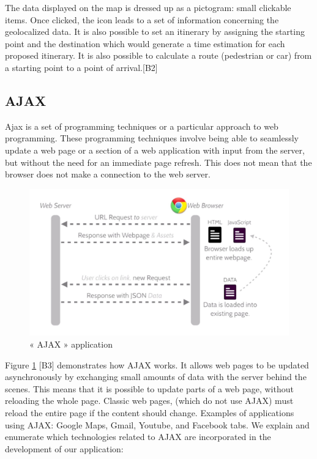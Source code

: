 The data displayed on the map is dressed up as a pictogram: small clickable items. Once clicked, the icon leads to a set of information concerning the geolocalized data. 
It is also possible to set an itinerary by assigning the starting point and the destination which would generate a time estimation for each proposed itinerary.
It is also possible to calculate a route (pedestrian or car) from a starting point  to a point of arrival.[B2]
\fi


\ifx
\subsection{AJAX }
Ajax is a set of programming techniques or a particular approach to web programming. 
These programming techniques involve being able to seamlessly update a web page or a section of a web application with input from the server, but without the need for an immediate page refresh. This does not mean that the browser does not make a connection to the web server.

\begin{figure}[!htpb] 
\begin{center}
\includegraphics[height=3.6 in]{images/ajax2.png}
\end{center}
\caption{« AJAX » application }
\label{ajax}
\end{figure} 

Figure \ref{ajax} [B3] demonstrates how AJAX works. It allows web pages to be updated
asynchronously by exchanging small amounts of data with the server behind the scenes. This means that it is possible to update parts of a web page, without reloading the whole page. 
Classic web pages, (which do not use AJAX) must reload the entire page if the content should change. Examples of applications using AJAX: Google Maps, Gmail, Youtube, and Facebook tabs.
We explain and enumerate which technologies related to AJAX are incorporated in
the development of our application:


